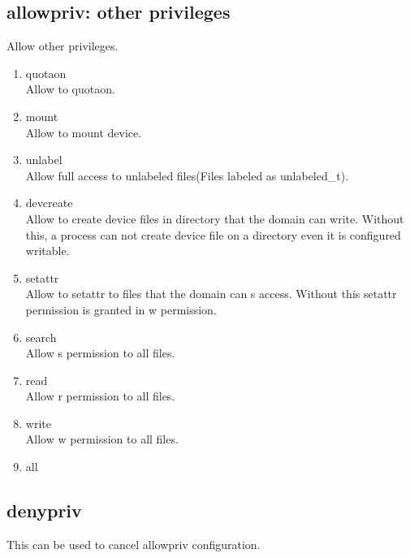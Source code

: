 \documentclass{article}
\begin{document}
\subsection{allowpriv: other privileges}
       Allow other privileges.
       \begin{enumerate}

	\item quotaon\\         
	      Allow to quotaon.
	\item mount\\         
	      Allow to mount device.

	\item unlabel\\
	      Allow full access to unlabeled files(Files labeled as
	      unlabeled\_t).

	\item devcreate\\
	      Allow to create device files in directory that the domain can write.
	      Without this, a process can not create device
	      file on a directory even it is configured writable.
	\item setattr\\
	      Allow to setattr to files that the domain can s
	      access. Without this setattr permission is granted in w permission.	\item search\\
	      Allow s permission to all files.
	\item read\\
	      Allow r permission to all files.
	\item write\\
	      Allow w permission to all files.
	\item all\\
       \end{enumerate}     

\subsection{denypriv}
This can be used to cancel allowpriv configuration.
\end{document}
